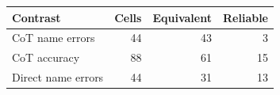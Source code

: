 \begin{tabular}{@{}lrrr@{}}
\toprule
Contrast & Cells & Equivalent & Reliable \\
\midrule
CoT name errors & 44 & 43 & 3 \\
CoT accuracy & 88 & 61 & 15 \\
Direct name errors & 44 & 31 & 13 \\
\bottomrule
\end{tabular}
